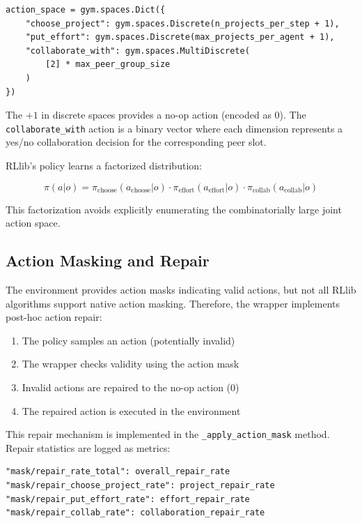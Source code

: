 \documentclass[english,bachelor]{hsluthesis}
\begin{document}
\begin{verbatim}
action_space = gym.spaces.Dict({
    "choose_project": gym.spaces.Discrete(n_projects_per_step + 1),
    "put_effort": gym.spaces.Discrete(max_projects_per_agent + 1),
    "collaborate_with": gym.spaces.MultiDiscrete(
        [2] * max_peer_group_size
    )
})
\end{verbatim}

The $+1$ in discrete spaces provides a no-op action (encoded as 0). The \texttt{collaborate\_with} action is a binary vector where each dimension represents a yes/no collaboration decision for the corresponding peer slot.

RLlib's policy learns a factorized distribution:

\begin{equation}
\pi(a|o) = \pi_{\text{choose}}(a_{\text{choose}}|o) \cdot \pi_{\text{effort}}(a_{\text{effort}}|o) \cdot \pi_{\text{collab}}(a_{\text{collab}}|o)
\end{equation}

This factorization avoids explicitly enumerating the combinatorially large joint action space.

\subsection{Action Masking and Repair}

The environment provides action masks indicating valid actions, but not all RLlib algorithms support native action masking. Therefore, the wrapper implements post-hoc action repair:

\begin{enumerate}
    \item The policy samples an action (potentially invalid)
    \item The wrapper checks validity using the action mask
    \item Invalid actions are repaired to the no-op action (0)
    \item The repaired action is executed in the environment
\end{enumerate}

This repair mechanism is implemented in the \texttt{\_apply\_action\_mask} method. Repair statistics are logged as metrics:

\begin{verbatim}
"mask/repair_rate_total": overall_repair_rate
"mask/repair_choose_project_rate": project_repair_rate
"mask/repair_put_effort_rate": effort_repair_rate
"mask/repair_collab_rate": collaboration_repair_rate
\end{verbatim}
\end{document}
